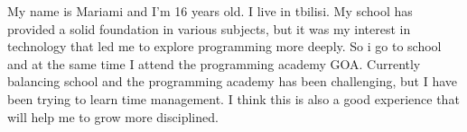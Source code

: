 My name is Mariami and I'm 16 years old. I live in tbilisi. My school has provided a solid foundation in various subjects, but it was my 
interest in technology that led me to explore programming more deeply. So i go to school and at the same time I attend the programming academy GOA. Currently
balancing school and the programming academy has been challenging, but I have been trying to learn time management. I think this is also a good 
experience that will help me to grow more disciplined.